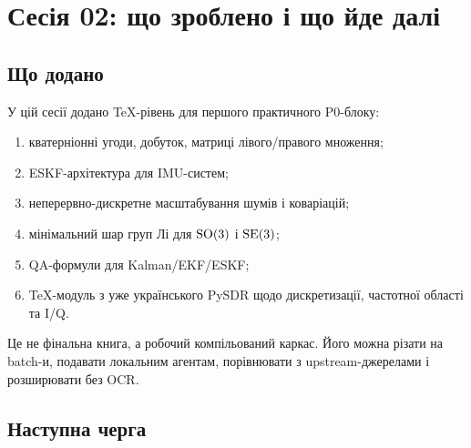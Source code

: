 \chapter{Сесія 02: що зроблено і що йде далі}

\section{Що додано}

У цій сесії додано TeX-рівень для першого практичного P0-блоку:
\begin{enumerate}[leftmargin=2em]
\item кватерніонні угоди, добуток, матриці лівого/правого множення;
\item ESKF-архітектура для IMU-систем;
\item неперервно-дискретне масштабування шумів і коваріацій;
\item мінімальний шар груп Лі для $\mathrm{SO}(3)$ і $\mathrm{SE}(3)$;
\item QA-формули для Kalman/EKF/ESKF;
\item TeX-модуль з уже українського PySDR щодо дискретизації, частотної області та I/Q.
\end{enumerate}

Це не фінальна книга, а робочий компільований каркас. Його можна різати на batch-и, подавати локальним агентам, порівнювати з upstream-джерелами і розширювати без OCR.

\section{Наступна черга}

